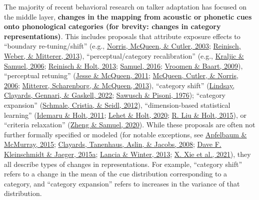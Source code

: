 \documentclass[
  11pt,
  english,
  man,floatsintext]{apa6}
\begin{document}
The majority of recent behavioral research on talker adaptation has focused on the middle layer, \textbf{changes in the mapping from acoustic or phonetic cues onto phonological categories (for brevity: changes in category representations)}. This includes proposals that attribute exposure effects to ``boundary re-tuning/shift'' (e.g., \protect\hyperlink{ref-norris2003}{Norris, McQueen, \& Cutler, 2003}; \protect\hyperlink{ref-reinisch2013}{Reinisch, Weber, \& Mitterer, 2013}), ``perceptual/category recalibration'' (e.g., \protect\hyperlink{ref-kraljic-samuel2006}{Kraljic \& Samuel, 2006}; \protect\hyperlink{ref-reinisch-holt2013}{Reinisch \& Holt, 2013}; \protect\hyperlink{ref-samuel2016}{Samuel, 2016}; \protect\hyperlink{ref-vroomen-baart2009}{Vroomen \& Baart, 2009}), ``perceptual retuning'' (\protect\hyperlink{ref-jesse-mcqueen2011}{Jesse \& McQueen, 2011}; \protect\hyperlink{ref-mcqueen2006}{McQueen, Cutler, \& Norris, 2006}; \protect\hyperlink{ref-mitterer2013}{Mitterer, Scharenborg, \& McQueen, 2013}), ``category shift'' (\protect\hyperlink{ref-lindsay2022}{Lindsay, Clayards, Gennari, \& Gaskell, 2022}; \protect\hyperlink{ref-sawusch-pisoni1976}{Sawusch \& Pisoni, 1976}); ``category expansion'' (\protect\hyperlink{ref-schmale2012}{Schmale, Cristia, \& Seidl, 2012}), ``dimension-based statistical learning'' (\protect\hyperlink{ref-idemaru-holt2011}{Idemaru \& Holt, 2011}; \protect\hyperlink{ref-lehet-holt2020}{Lehet \& Holt, 2020}; \protect\hyperlink{ref-liu-holt2015}{R. Liu \& Holt, 2015}), or ``criteria relaxation'' (\protect\hyperlink{ref-zheng-samuel2020}{Zheng \& Samuel, 2020}). While these proposals are often not further formally specified or modeled (for notable exceptions, see \protect\hyperlink{ref-apfelbaum-mcmurray2015}{Apfelbaum \& McMurray, 2015}; \protect\hyperlink{ref-clayards2008}{Clayards, Tanenhaus, Aslin, \& Jacobs, 2008}; \protect\hyperlink{ref-kleinschmidt-jaeger2015}{Dave F. Kleinschmidt \& Jaeger, 2015a}; \protect\hyperlink{ref-lancia-winter2013}{Lancia \& Winter, 2013}; \protect\hyperlink{ref-xie2021cognition}{X. Xie et al., 2021}), they all describe types of changes in representations. For example, ``category shift'' refers to a change in the mean of the cue distribution corresponding to a category, and ``category expansion'' refers to increases in the variance of that distribution.
\end{document}
